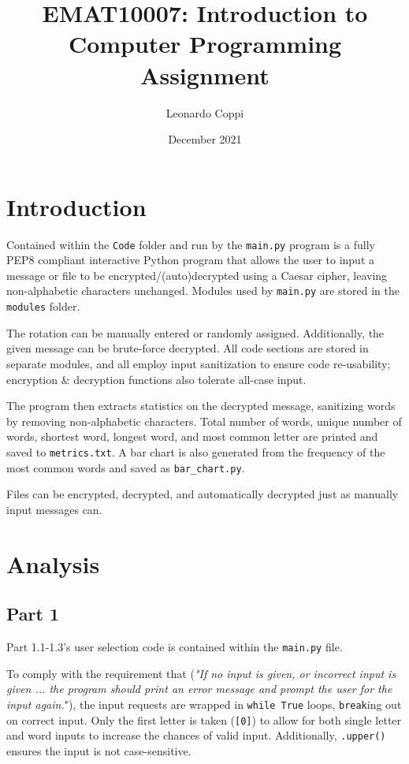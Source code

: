 \documentclass{article}
\title{EMAT10007: Introduction to Computer Programming Assignment}
\author{Leonardo Coppi}
\date{December 2021}
\begin{document}
\maketitle

\section{Introduction}
Contained within the \texttt{Code} folder and run by the \texttt{main.py} program is a fully PEP8 compliant interactive Python program that allows the user to input a message or file to be encrypted/(auto)decrypted using a Caesar cipher, leaving non-alphabetic characters unchanged. Modules used by \texttt{main.py} are stored in the \texttt{modules} folder.

The rotation can be manually entered or randomly assigned. Additionally, the given message can be brute-force decrypted. All code sections are stored in separate modules, and all employ input sanitization to ensure code re-usability; encryption \& decryption functions also tolerate all-case input.

The program then extracts statistics on the decrypted message, sanitizing words by removing non-alphabetic characters. Total number of words, unique number of words, shortest word, longest word, and most common letter are printed and saved to \texttt{metrics.txt}. A bar chart is also generated from the frequency of the most common words and saved as \texttt{bar\_chart.py}.

Files can be encrypted, decrypted, and automatically decrypted just as manually input messages can.


\section{Analysis}
\subsection{Part 1}
Part 1.1-1.3's user selection code is contained within the \texttt{main.py} file.

To comply with the requirement that (\textit{"If no input is given, or incorrect input is given ... the program should print an error message and prompt the user for the input again.}"), the input requests are wrapped in \texttt{while True} loops, \texttt{break}ing out on correct input. Only the first letter is taken (\texttt{[0]}) to allow for both single letter and word inputs to increase the chances of valid input. Additionally, \texttt{.upper()} ensures the input is not case-sensitive.
\end{document}

